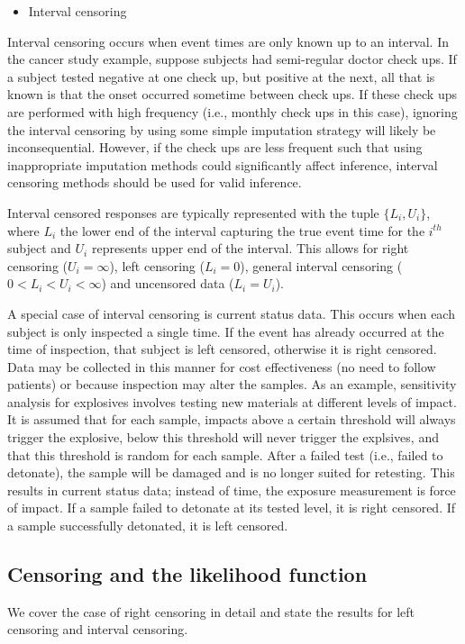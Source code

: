\documentclass[a4paper]{article}
\begin{document}
  \begin{itemize}
  \item Interval censoring
  \end{itemize}

  Interval censoring occurs when event times are only known up to an interval. In the cancer study example, suppose subjects had semi-regular doctor check ups. If a subject tested negative at one check up, but positive at the next, all that is known is that the onset occurred sometime between check ups. If these check ups are performed with high frequency (i.e., monthly check ups in this case), ignoring the interval censoring by using some simple imputation strategy will likely be inconsequential. However, if the check ups are less frequent such that using inappropriate imputation methods could significantly affect inference, interval censoring methods should be used for valid inference. 
  
  Interval censored responses are typically represented with the tuple $\{L_i, U_i\}$, where $L_i$ the lower end of the interval capturing the true event time for the $i^{th}$ subject and $U_i$ represents upper end of the interval. This allows for right censoring ($U_i = \infty$), left censoring ($L_i = 0$), general interval censoring ($0 < L_i < U_i < \infty$) and uncensored data ($L_i = U_i$). 

  A special case of interval censoring is current status data. This occurs when each subject is only inspected a single time. If the event has already occurred at the time of inspection, that subject is left censored, otherwise it is right censored. Data may be collected in this manner for cost effectiveness (no need to follow patients) or because inspection may alter the samples. As an example, sensitivity analysis for explosives involves testing new materials at different levels of impact. It is assumed that for each sample, impacts above a certain threshold will always trigger the explosive, below this threshold will never trigger the explsives, and that this threshold is random for each sample. After a failed test (i.e., failed to detonate), the sample will be damaged and is no longer suited for retesting. This results in current status data; instead of time, the exposure measurement is force of impact. If a sample failed to detonate at its tested level, it is right censored. If a sample successfully detonated, it is left censored. 

  \subsection{Censoring and the likelihood function}
  \label{sec:llk}
  We cover the case of right censoring in detail and state the results for left censoring and interval censoring. 
  
\end{document}
